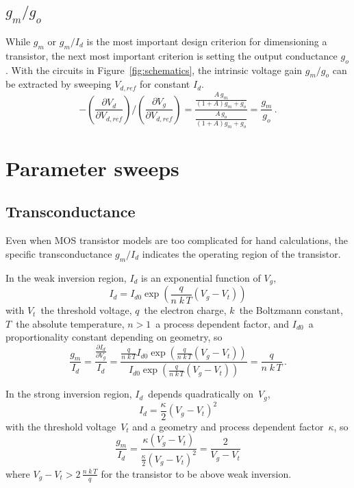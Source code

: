 \documentclass[journal]{IEEEtran}
\def\le{\left}
\def\ri{\right}
\begin{document}
\subsection{$g_m/g_o$}
%
While $g_m$ or $g_m/I_d$ is the most important design criterion for dimensioning a transistor,
the next most important criterion is setting the output conductance $g_o$. 
With the circuits in Figure~\ref{fig:schematics}, 
the intrinsic voltage gain $g_m/g_o$ can be extracted by sweeping $V_{d,ref}$ for constant $I_d$.
\begin{equation}\label{egn:gm_over_go}
-\le(\frac{\partial V_d}{\partial V_{d,ref}}\ri)
/\le(\frac{\partial V_g}{\partial V_{d,ref}}\ri)
= \frac{\frac{A\,g_m}{\le(1+A\ri)g_m+g_o}}{\frac{A\,g_o}{\le(1+A\ri)g_m+g_o}} 
= \frac{g_m}{g_o} \,.
\end{equation}

\section{Parameter sweeps}
\subsection{Transconductance}
%
Even when MOS transistor models are too complicated for hand calculations,
the specific transconductance $g_m/I_d$ indicates the operating region of the transistor.
 
In the weak inversion region, $I_d$ is an exponential function of $V_g$,
\begin{equation}
I_d = I_{d{0}} \exp\le(\frac{q}{n\;k\,T}\le(V_g-V_t\ri)\ri)
\end{equation}
with $V_t$~the threshold voltage, $q$~the electron charge, $k$~the Boltzmann constant, 
$T$~the absolute temperature, $n>1$~a process dependent factor, 
and $I_{d{0}}$~a proportionality constant depending on geometry,
so
\begin{equation}
\frac{g_m}{I_d}
= \frac{\frac{\partial I_d}{\partial V_g}}{I_d} 
= \frac{\frac{q}{n\;k\,T} I_{d{0}} \exp\le(\frac{q}{n\;k\,T}\le(V_g-V_t\ri)\ri)}
       {I_{d{0}} \exp\le(\frac{q}{n\;k\,T}\le(V_g-V_t\ri)\ri)}
= \frac{q}{n\;k\,T}\,.
\end{equation}

In the strong inversion region, $I_d$~depends quadratically on~$V_g$,
\begin{equation}
I_d = \frac{\kappa}{2}\le(V_g-V_t\ri)^2
\end{equation}
with the threshold voltage~$V_t$ and a geometry and process dependent factor~$\kappa$,
so 
\begin{equation}
\frac{g_m}{I_d}
= \frac{\kappa\le(V_g-V_t\ri)}{\frac{\kappa}{2}\le(V_g-V_t\ri)^2}
= \frac{2}{V_g-V_t}
\end{equation}
where $V_g-V_t > 2\,\frac{n\;k\,T}{q}$ for the transistor to be above weak inversion.
\end{document}
